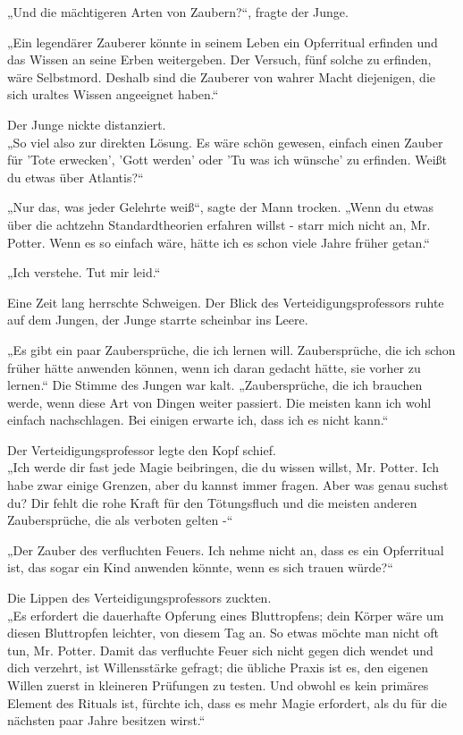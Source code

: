 {„Und die mächtigeren Arten von Zaubern?“, fragte der Junge.

„Ein legendärer Zauberer könnte in seinem Leben ein Opferritual erfinden und das Wissen an seine Erben weitergeben. Der Versuch, fünf solche zu erfinden, wäre Selbstmord. Deshalb sind die Zauberer von wahrer Macht diejenigen, die sich uraltes Wissen angeeignet haben.“

Der Junge nickte distanziert.\\ „So viel also zur direkten Lösung. Es wäre schön gewesen, einfach einen Zauber für 'Tote erwecken', 'Gott werden' oder 'Tu was ich wünsche' zu erfinden. Weißt du etwas über Atlantis?“

„Nur das, was jeder Gelehrte weiß“, sagte der Mann trocken. „Wenn du etwas über die achtzehn Standardtheorien erfahren willst - starr mich nicht an, Mr. Potter. Wenn es so einfach wäre, hätte ich es schon viele Jahre früher getan.“

„Ich verstehe. Tut mir leid.“

Eine Zeit lang herrschte Schweigen. Der Blick des Verteidigungsprofessors ruhte auf dem Jungen, der Junge starrte scheinbar ins Leere.

„Es gibt ein paar Zaubersprüche, die ich lernen will. Zaubersprüche, die ich schon früher hätte anwenden können, wenn ich daran gedacht hätte, sie vorher zu lernen.“ Die Stimme des Jungen war kalt. „Zaubersprüche, die ich brauchen werde, wenn diese Art von Dingen weiter passiert. Die meisten kann ich wohl einfach nachschlagen. Bei einigen erwarte ich, dass ich es nicht kann.“

Der Verteidigungsprofessor legte den Kopf schief.\\ „Ich werde dir fast jede Magie beibringen, die du wissen willst, Mr. Potter. Ich habe zwar einige Grenzen, aber du kannst immer fragen. Aber was genau suchst du? Dir fehlt die rohe Kraft für den Tötungsfluch und die meisten anderen Zaubersprüche, die als verboten gelten -“

„Der Zauber des verfluchten Feuers. Ich nehme nicht an, dass es ein Opferritual ist, das sogar ein Kind anwenden könnte, wenn es sich trauen würde?“

Die Lippen des Verteidigungsprofessors zuckten.\\ „Es erfordert die dauerhafte Opferung eines Bluttropfens; dein Körper wäre um diesen Bluttropfen leichter, von diesem Tag an. So etwas möchte man nicht oft tun, Mr. Potter. Damit das verfluchte Feuer sich nicht gegen dich wendet und dich verzehrt, ist Willensstärke gefragt; die übliche Praxis ist es, den eigenen Willen zuerst in kleineren Prüfungen zu testen. Und obwohl es kein primäres Element des Rituals ist, fürchte ich, dass es mehr Magie erfordert, als du für die nächsten paar Jahre besitzen wirst.“

}
